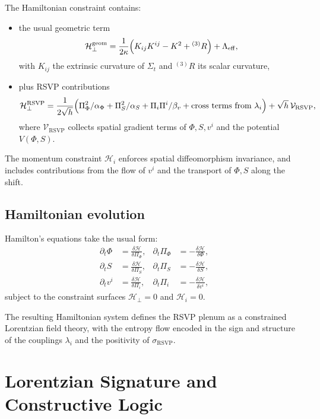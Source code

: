 The Hamiltonian constraint contains:
\begin{itemize}
  \item the usual geometric term
    \[
      \mathcal{H}_\perp^{\mathrm{geom}}
         = \frac{1}{2\kappa}\Bigl(
              K_{ij}K^{ij} - K^2 + {}^{(3)}R
            \Bigr)
           + \Lambda_{\mathrm{eff}},
    \]
    with $K_{ij}$ the extrinsic curvature of $\Sigma_t$ and ${}^{(3)}R$ its scalar curvature,
  \item plus RSVP contributions
    \[
    \mathcal{H}_\perp^{\mathrm{RSVP}}
      = \frac{1}{2\sqrt{h}} \Bigl(
          \Pi_\Phi^2/\alpha_\Phi
        + \Pi_S^2/\alpha_S
        + \Pi_i \Pi^i/\beta_v
        + \text{cross terms from }\lambda_i
        \Bigr) + \sqrt{h}\,\mathcal{V}_{\mathrm{RSVP}},
    \]
    where $\mathcal{V}_{\mathrm{RSVP}}$ collects spatial gradient terms of $\Phi,S,v^i$ and the potential $V(\Phi,S)$.
\end{itemize}

The momentum constraint $\mathcal{H}_i$ enforces spatial diffeomorphism invariance, and includes contributions from the flow of $v^i$ and the transport of $\Phi,S$ along the shift.

\subsection{Hamiltonian evolution}

Hamilton’s equations take the usual form:
\begin{align}
\partial_t \Phi &= \frac{\delta \mathcal{H}}{\delta \Pi_\Phi}, &
\partial_t \Pi_\Phi &= -\frac{\delta \mathcal{H}}{\delta \Phi}, \\
\partial_t S &= \frac{\delta \mathcal{H}}{\delta \Pi_S}, &
\partial_t \Pi_S &= -\frac{\delta \mathcal{H}}{\delta S}, \\
\partial_t v^i &= \frac{\delta \mathcal{H}}{\delta \Pi_i}, &
\partial_t \Pi_i &= -\frac{\delta \mathcal{H}}{\delta v^i},
\end{align}
subject to the constraint surfaces $\mathcal{H}_\perp=0$ and $\mathcal{H}_i=0$.

The resulting Hamiltonian system defines the RSVP plenum as a constrained Lorentzian field theory, with the entropy flow encoded in the sign and structure of the couplings $\lambda_i$ and the positivity of $\sigma_{\mathrm{RSVP}}$.

\section{Lorentzian Signature and Constructive Logic}

